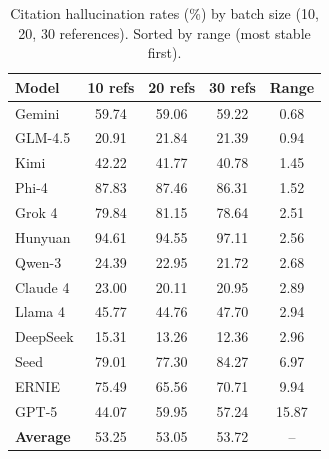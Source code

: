 \begin{table}[t]
\centering
\caption{Citation hallucination rates (\%) by batch size (10, 20, 30 references). Sorted by range (most stable first).}
\label{tab:batch_size}
\small
{}
\begin{tabular}{lcccc}
\toprule
\textbf{Model} & \cellcolor{red!12}\textbf{10 refs} & \cellcolor{red!12}\textbf{20 refs} & \cellcolor{red!12}\textbf{30 refs} & \cellcolor{red!12}\textbf{Range} \\
\midrule
Gemini & \cellcolor{red!24}59.74 & \cellcolor{red!24}59.06 & \cellcolor{red!24}59.22 & \cellcolor{red!8}0.68 \\
GLM-4.5 & \cellcolor{red!12}20.91 & \cellcolor{red!12}21.84 & \cellcolor{red!12}21.39 & \cellcolor{red!8}0.94 \\
Kimi & \cellcolor{red!20}42.22 & \cellcolor{red!20}41.77 & \cellcolor{red!20}40.78 & \cellcolor{red!10}1.45 \\
Phi-4 & \cellcolor{red!34}87.83 & \cellcolor{red!34}87.46 & \cellcolor{red!34}86.31 & \cellcolor{red!12}1.52 \\
Grok 4 & \cellcolor{red!30}79.84 & \cellcolor{red!30}81.15 & \cellcolor{red!30}78.64 & \cellcolor{red!14}2.51 \\
Hunyuan & \cellcolor{red!34}94.61 & \cellcolor{red!34}94.55 & \cellcolor{red!34}97.11 & \cellcolor{red!14}2.56 \\
Qwen-3 & \cellcolor{red!14}24.39 & \cellcolor{red!14}22.95 & \cellcolor{red!14}21.72 & \cellcolor{red!14}2.68 \\
Claude 4 & \cellcolor{red!14}23.00 & \cellcolor{red!14}20.11 & \cellcolor{red!14}20.95 & \cellcolor{red!14}2.89 \\
Llama 4 & \cellcolor{red!20}45.77 & \cellcolor{red!20}44.76 & \cellcolor{red!20}47.70 & \cellcolor{red!14}2.94 \\
DeepSeek & \cellcolor{red!10}15.31 & \cellcolor{red!10}13.26 & \cellcolor{red!10}12.36 & \cellcolor{red!14}2.96 \\
Seed & \cellcolor{red!30}79.01 & \cellcolor{red!30}77.30 & \cellcolor{red!30}84.27 & \cellcolor{red!18}6.97 \\
ERNIE & \cellcolor{red!30}75.49 & \cellcolor{red!26}65.56 & \cellcolor{red!28}70.71 & \cellcolor{red!18}9.94 \\
GPT-5 & \cellcolor{red!20}44.07 & \cellcolor{red!26}59.95 & \cellcolor{red!26}57.24 & \cellcolor{red!20}15.87 \\
\midrule
\textbf{Average} & \cellcolor{red!20}53.25 & \cellcolor{red!20}53.05 & \cellcolor{red!20}53.72 & \cellcolor{red!12}-- \\
\bottomrule
\end{tabular}
\end{table}

